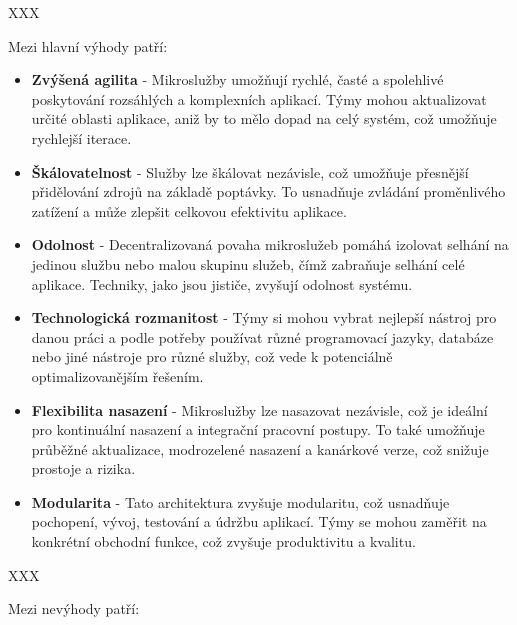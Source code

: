 
XXX

Mezi hlavní výhody patří:

\begin{itemize}

\item \textbf{Zvýšená agilita} - Mikroslužby umožňují rychlé, časté a spolehlivé poskytování rozsáhlých a komplexních aplikací. Týmy mohou aktualizovat určité oblasti aplikace, aniž by to mělo dopad na celý systém, což umožňuje rychlejší iterace.

\item \textbf{Škálovatelnost} - Služby lze škálovat nezávisle, což umožňuje přesnější přidělování zdrojů na základě poptávky. To usnadňuje zvládání proměnlivého zatížení a může zlepšit celkovou efektivitu aplikace.

\item \textbf{Odolnost} - Decentralizovaná povaha mikroslužeb pomáhá izolovat selhání na jedinou službu nebo malou skupinu služeb, čímž zabraňuje selhání celé aplikace. Techniky, jako jsou jističe, zvyšují odolnost systému.

\item \textbf{Technologická rozmanitost} - Týmy si mohou vybrat nejlepší nástroj pro danou práci a podle potřeby používat různé programovací jazyky, databáze nebo jiné nástroje pro různé služby, což vede k potenciálně optimalizovanějším řešením.

\item \textbf{Flexibilita nasazení} - Mikroslužby lze nasazovat nezávisle, což je ideální pro kontinuální nasazení a integrační pracovní postupy. To také umožňuje průběžné aktualizace, modrozelené nasazení a kanárkové verze, což snižuje prostoje a rizika.

\item \textbf{Modularita} - Tato architektura zvyšuje modularitu, což usnadňuje pochopení, vývoj, testování a údržbu aplikací. Týmy se mohou zaměřit na konkrétní obchodní funkce, což zvyšuje produktivitu a kvalitu.

\end{itemize}

XXX

Mezi nevýhody patří:

